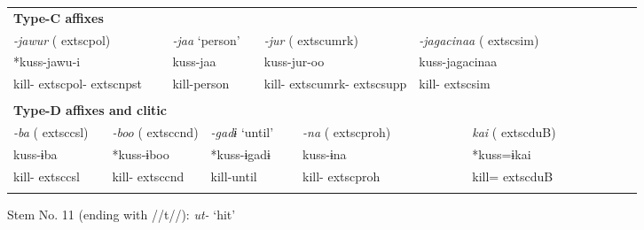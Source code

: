 \begin{tabularx}{\textwidth}{XXm{}XXXXXXXXXXXXXXXXXXXX}
\multicolumn{23}{X}{{\bfseries Type-C affixes}}\\
\multicolumn{4}{X}{{ \textit{{}-jawur} (	extsc{pol})}} & \multicolumn{3}{X}{{ \textit{{}-jaa} ‘person’}} & \multicolumn{5}{X}{{ \textit{{}-jur} (	extsc{umrk})}} & \multicolumn{4}{X}{{ \textit{{}-jagacinaa} (	extsc{sim})}} & \multicolumn{7}{X}{}\\
\multicolumn{4}{X}{{ *kuss-jawu-i}} & \multicolumn{3}{X}{kuss-jaa} & \multicolumn{5}{X}{{ kuss-jur-oo}} & \multicolumn{4}{X}{{ kuss-jagacinaa}} & \multicolumn{7}{X}{}\\
\multicolumn{4}{X}{kill-	extsc{pol}-	extsc{npst}} & \multicolumn{3}{X}{kill-person} & \multicolumn{5}{X}{kill-	extsc{umrk}-	extsc{supp}} & \multicolumn{4}{X}{kill-	extsc{sim}} & \multicolumn{7}{X}{}\\
\multicolumn{23}{X}{}\\
\multicolumn{23}{X}{{\bfseries Type-D affixes and clitic}}\\
{ \textit{{}-ba} (	extsc{csl})} & \multicolumn{4}{X}{{ \textit{{}-boo} (	extsc{cnd})}} & \multicolumn{4}{X}{{ \textit{{}-gadɨ} ‘until’}} & \multicolumn{4}{X}{{ \textit{{}-na} (	extsc{proh})}} & \multicolumn{4}{X}{{ \textit{kai} (	extsc{du}B)}} & \multicolumn{6}{X}{}\\
{ kuss-ɨba} & \multicolumn{4}{X}{{ *kuss-ɨboo}} & \multicolumn{4}{X}{{ *kuss-ɨgadɨ}} & \multicolumn{4}{X}{{ kuss-ɨna}} & \multicolumn{4}{X}{{ *kuss=ɨkai}} & \multicolumn{6}{X}{}\\
kill-	extsc{csl} & \multicolumn{4}{X}{kill-	extsc{cnd}} & \multicolumn{4}{X}{kill-until} & \multicolumn{4}{X}{kill-	extsc{proh}} & \multicolumn{4}{X}{kill=	extsc{du}B} & \multicolumn{6}{X}{}\\
\lspbottomrule
\end{tabularx}
Stem No. 11 (ending with //t//): \textit{ut-} ‘hit’

\tablefirsthead{}


